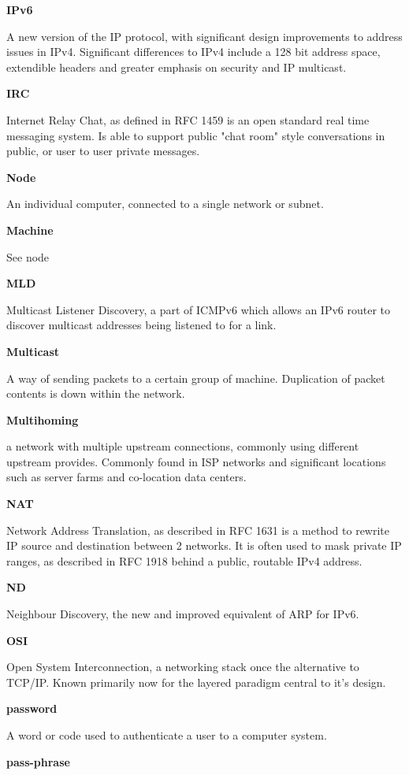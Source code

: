 \textbf{IPv6}

A new version of the IP protocol, with significant design improvements
to address issues in IPv4. Significant differences to IPv4 include a
128 bit address space, extendible headers and greater emphasis on 
security and IP multicast.

\textbf{IRC}

Internet Relay Chat, as defined in RFC 1459 is an open standard real
time messaging system. Is able to support public "chat room" style
conversations in public, or user to user private messages.

\textbf{Node}

An individual computer, connected to a single network or subnet.

\textbf{Machine}

See node

\textbf{MLD}

Multicast Listener Discovery, a part of ICMPv6 which allows an IPv6
router to discover multicast addresses being listened to for a link.

\textbf{Multicast}

A way of sending packets to a certain group of machine. Duplication of
packet contents is down within the network.

\textbf{Multihoming}

a network with multiple upstream connections, commonly using different
upstream provides. Commonly found in ISP networks and significant
locations such as server farms and co-location data centers.

\textbf{NAT}

Network Address Translation, as described in RFC 1631 is a method
to rewrite IP source and destination between 2 networks. It is often
used to mask private IP ranges, as described in RFC 1918 behind a 
public, routable IPv4 address. 

\textbf{ND}

Neighbour Discovery, the new and improved equivalent of ARP for IPv6.

\textbf{OSI}

Open System Interconnection, a networking stack once the alternative to
TCP/IP. Known primarily now for the layered paradigm central to it's
design.

\textbf{password}

A word or code used to authenticate a user to a computer system.

\textbf{pass-phrase}

